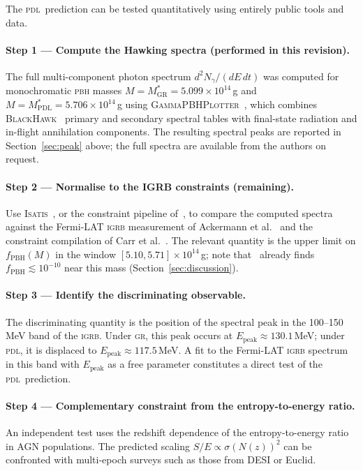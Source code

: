 \documentclass[12pt, a4paper]{article}
\theoremstyle{definition}
\newcommand{\PDL}{\textsc{pdl}}
\newcommand{\MstarGR}{M^{*}_{\mathrm{GR}}}
\newcommand{\MstarPDL}{M^{*}_{\mathrm{PDL}}}
\begin{document}
The \PDL\ prediction can be tested quantitatively using entirely public tools and data.

\paragraph{Step 1 — Compute the Hawking spectra (performed in this revision).} The full multi-component photon spectrum $d^2N_\gamma/(dE\,dt)$ was computed for monochromatic \textsc{pbh} masses $M=\MstarGR=5.099\times10^{14}$\,g and $M=\MstarPDL=5.706\times10^{14}$\,g using \textsc{GammaPBHPlotter}~\cite{Carlini2025}, which combines \textsc{BlackHawk}~\cite{BlackHawk} primary and secondary spectral tables with final-state radiation and in-flight annihilation components. The resulting spectral peaks are reported in Section~\ref{sec:peak} above; the full spectra are available from the authors on request.

\paragraph{Step 2 — Normalise to the IGRB constraints (remaining).} Use \textsc{Isatis}~\cite{Isatis}, or the constraint pipeline of~\cite{Cholis2026}, to compare the computed spectra against the Fermi-LAT \textsc{igrb} measurement of Ackermann et al.~\cite{FermiIGRB2015} and the constraint compilation of Carr et al.~\cite{Carr2021}. The relevant quantity is the upper limit on $f_{\mathrm{PBH}}(M)$ in the window $[5.10, 5.71]\times10^{14}$\,g; note that~\cite{Cholis2026} already finds $f_{\mathrm{PBH}}\lesssim10^{-10}$ near this mass (Section~\ref{sec:discussion}).

\paragraph{Step 3 — Identify the discriminating observable.} The discriminating quantity is the position of the spectral peak in the 100--150\,MeV band of the \textsc{igrb}. Under \textsc{gr}, this peak occurs at $E_{\mathrm{peak}} \approx 130.1$\,MeV; under \PDL, it is displaced to $E_{\mathrm{peak}} \approx 117.5$\,MeV. A fit to the Fermi-LAT \textsc{igrb} spectrum in this band with $E_{\mathrm{peak}}$ as a free parameter constitutes a direct test of the \PDL\ prediction.

\paragraph{Step 4 — Complementary constraint from the entropy-to-energy ratio.} An independent test uses the redshift dependence of the entropy-to-energy ratio in AGN populations. The predicted scaling $S/E \propto \sigma(N(z))^2$ can be confronted with multi-epoch surveys such as those from DESI or Euclid.
\end{document}
